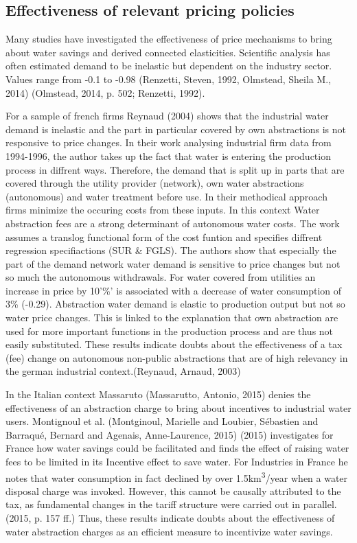 \documentclass[11pt]{article}
\begin{document}
\subsection{Effectiveness of relevant pricing policies}
\label{sec:orgcd897fd}
\label{sec: Effectiveness of WAF}
Many studies have investigated the effectiveness of price mechanisms to bring about water savings and derived connected elasticities. Scientific analysis has often estimated demand to be inelastic but dependent on the industry sector. Values range from -0.1 to -0.98 (Renzetti, Steven, 1992,  Olmstead, Sheila M., 2014)  (Olmstead, 2014, p. 502; Renzetti, 1992).

For a sample of french firms Reynaud (2004) shows that the industrial water demand is inelastic and the part in particular covered by own abstractions is not responsive to price changes.
In their work analysing industrial firm data from 1994-1996, the author takes up the fact that water is entering the production process in diffrent ways. Therefore, the demand that is split up in parts that are covered through the utility provider (network), own water abstractions (autonomous) and water treatment before use.
In their methodical approach firms minimize the occuring costs from these inputs. In this context Water abstraction fees are a strong determinant of autonomous water costs.  The work assumes a translog functional form of the cost funtion and specifies diffrent regression specifiactions (SUR \& FGLS).
The authors show that especially the part of the demand network water demand is sensitive to price changes but not so much the autonomous withdrawals.
For water covered from utilities an increase in price by 10'\%' is associated with a decrease of water consumption of 3\% (-0.29). Abstraction water demand is elastic to production output but not so water price changes.
This is linked to the explanation that own abstraction are used for more important functions in the production process and are thus not easily substituted.
These results indicate doubts about the effectiveness of a tax (fee) change on autonomous non-public abstractions that are of high relevancy in the german industrial context.(Reynaud, Arnaud, 2003)

In the Italian context Massaruto (Massarutto, Antonio, 2015) denies the effectiveness of an abstraction charge to bring about incentives to industrial water users. Montignoul et al. (Montginoul, Marielle and Loubier, Sébastien and Barraqué, Bernard and Agenais, Anne-Laurence, 2015) (2015) investigates for France how water savings could be facilitated and finds the effect of raising water fees to be limited in its Incentive effect to save water. For Industries in France he notes that water consumption in fact declined by over 1.5km\textsuperscript{3}/year when a water disposal charge was invoked. However, this cannot be causally attributed to the tax, as fundamental changes in the tariff structure were carried out in parallel.(2015, p. 157 ff.)
Thus, these results indicate doubts about the effectiveness of water abstraction charges as an efficient measure to incentivize water savings.
\end{document}
